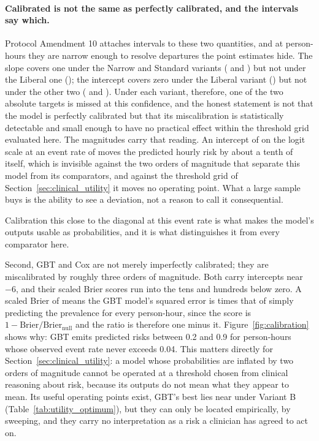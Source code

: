 \paragraph{Calibrated is not the same as perfectly calibrated, and the
intervals say which.} Protocol Amendment 10 attaches intervals to these two
quantities, and at \pcNTestRowsB{} person-hours they are narrow enough to
resolve departures the point estimates hide. The slope covers one under the
Narrow and Standard variants (\pcCalibSlopeCiA{} and \pcCalibSlopeCiB) but not
under the Liberal one (\pcCalibSlopeCiC); the intercept covers zero under the
Liberal variant (\pcCalibIntCiC) but not under the other two
(\pcCalibIntCiA{} and \pcCalibIntCiB). Under each variant, therefore, one of
the two absolute targets is missed at this confidence, and the honest statement
is not that the model is perfectly calibrated but that its miscalibration is
statistically detectable and small enough to have no practical effect within the
threshold grid evaluated here. The
magnitudes carry that reading. An intercept of \pcCalibIntPrimaryB{} on the
logit scale at an event rate of \pcPrevalenceB{} moves the predicted hourly
risk by about a tenth of itself, which is invisible against the two orders of
magnitude that separate this model from its comparators, and against the
threshold grid of Section~\ref{sec:clinical_utility} it moves no operating
point. What a large sample buys is the ability to see a deviation, not a reason
to call it consequential.

Calibration this close to the diagonal
at this event rate is what makes the model's outputs usable as
probabilities, and it is what distinguishes it from every comparator
here.

Second, GBT and Cox are not merely imperfectly calibrated; they are
miscalibrated by roughly three orders of magnitude. Both carry intercepts near
$-6$, and their scaled Brier scores run into the tens and hundreds below zero.
A scaled Brier of \pcBrierScaledGbtB{} means the GBT model's squared error is
\pcBrierRatioGbtB{} times that of simply predicting the prevalence for every
person-hour, since the score is $1 - \text{Brier}/\text{Brier}_{\text{null}}$
and the ratio is therefore one minus it. Figure~\ref{fig:calibration}
shows why: GBT emits predicted risks between 0.2 and 0.9 for person-hours
whose observed event rate never exceeds 0.04. This matters directly for
Section~\ref{sec:clinical_utility}: a model whose probabilities are inflated by
two orders of magnitude cannot be operated at a threshold chosen from clinical
reasoning about risk, because its outputs do not mean what they appear to mean.
Its useful operating points exist, GBT's best lies near
\pcUtilityOptThresholdGbtB{} under Variant B
(Table~\ref{tab:utility_optimum}), but they can only be located empirically,
by sweeping, and they carry no interpretation as a risk a clinician has agreed
to act on.

